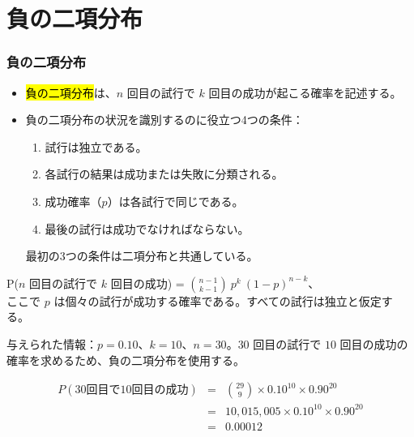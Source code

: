 
\section{負の二項分布}


\begin{frame}
\frametitle{負の二項分布}

\begin{itemize}

\item \hl{負の二項分布}は、$n$ 回目の試行で $k$ 回目の成功が起こる確率を記述する。

\item 負の二項分布の状況を識別するのに役立つ4つの条件：
\begin{enumerate}
\item 試行は独立である。
\item 各試行の結果は成功または失敗に分類される。
\item 成功確率（$p$）は各試行で同じである。
\item 最後の試行は成功でなければならない。
\end{enumerate}
最初の3つの条件は二項分布と共通している。

\end{itemize}

\vfill

{
P($n$ 回目の試行で $k$ 回目の成功) = ${n-1 \choose k-1}~p^k~(1-p)^{n-k}$、\\
ここで $p$ は個々の試行が成功する確率である。すべての試行は独立と仮定する。
}

\end{frame}


\begin{frame}[shrink=10]


与えられた情報：$p = 0.10$、$k = 10$、$n = 30$。$30$ 回目の試行で $10$ 回目の成功の確率を求めるため、負の二項分布を使用する。

\begin{eqnarray*}
P(\text{30回目で10回目の成功}) &=& {29 \choose 9} \times 0.10^{10} \times 0.90^{20} \\
&=& 10,015,005 \times 0.10^{10} \times 0.90^{20} \\
&=& 0.00012
\end{eqnarray*}

\end{frame}

